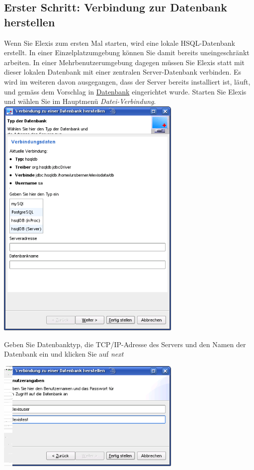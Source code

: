 \subsection{Erster Schritt: Verbindung zur Datenbank herstellen}
Wenn Sie Elexis zum ersten Mal starten, wird eine lokale HSQL-Datenbank erstellt. In einer Einzelplatzumgebung können Sie damit bereits uneingeschränkt arbeiten. In einer Mehrbenutzerumgebung dagegen müssen Sie Elexis statt mit dieser lokalen Datenbank mit einer zentralen Server-Datenbank verbinden. Es wird im weiteren davon ausgegangen, dass der Server bereits installiert ist, läuft, und gemäss dem Vorschlag in \href{http://www.elexis.ch/jp/index.php?option=content&task=view&id=72}{Datenbank} eingerichtet wurde.
Starten Sie Elexis und wählen Sie im Hauptmenü \textit{Datei-Verbindung}.
\includegraphics[width=3.5in]{images/verb1.png}

Geben Sie Datenbanktyp, die TCP/IP-Adresse des Servers und den Namen der Datenbank ein und klicken Sie auf \textit{next}

\includegraphics[width=3.5in]{images/verb2.png}

